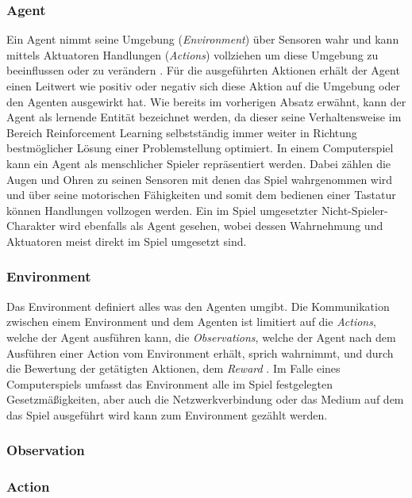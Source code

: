 \documentclass[11pt]{scrartcl}
\begin{document}
\subsubsection{Agent}
Ein Agent nimmt seine Umgebung (\textit{Environment}) über Sensoren wahr und kann mittels Aktuatoren
Handlungen (\textit{Actions}) vollziehen um diese Umgebung zu beeinflussen oder zu verändern 
\cite[~S.60]{RN2009}. Für die ausgeführten Aktionen erhält der Agent einen Leitwert wie positiv oder
negativ sich diese Aktion auf die Umgebung oder den Agenten ausgewirkt hat. Wie bereits im vorherigen
Absatz erwähnt, kann der Agent als lernende Entität bezeichnet werden, da dieser seine Verhaltensweise
im Bereich  Reinforcement Learning selbstständig immer weiter in Richtung bestmöglicher Lösung einer 
Problemstellung optimiert. In einem Computerspiel kann ein Agent als menschlicher Spieler
repräsentiert werden. Dabei zählen die Augen und Ohren zu seinen Sensoren mit denen das Spiel
wahrgenommen wird und über seine motorischen Fähigkeiten und somit dem bedienen einer Tastatur
können Handlungen vollzogen werden. Ein im Spiel umgesetzter Nicht-Spieler-Charakter wird ebenfalls
als Agent gesehen, wobei dessen Wahrnehmung und Aktuatoren meist direkt im Spiel umgesetzt sind.


\subsubsection{Environment}
Das Environment definiert alles was den Agenten umgibt. Die Kommunikation zwischen einem Environment
und dem Agenten ist limitiert auf die \textit{Actions}, welche der Agent ausführen kann, die 
\textit{Observations}, welche der Agent nach dem Ausführen einer Action vom Environment erhält, 
sprich wahrnimmt, und durch die Bewertung der getätigten Aktionen, dem \textit{Reward} 
\cite[~S.5]{L2018}. Im Falle eines Computerspiels umfasst das Environment alle im Spiel festgelegten
Gesetzmäßigkeiten, aber auch die Netzwerkverbindung oder das Medium auf dem das Spiel ausgeführt
wird kann zum Environment gezählt werden.


\subsubsection{Observation}

\subsubsection{Action}
\end{document}

